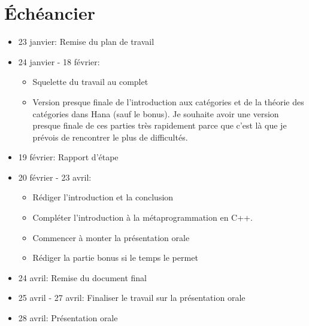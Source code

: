 \documentclass{article}
\begin{document}
\section{Échéancier}
\begin{itemize}
    \item 23 janvier: Remise du plan de travail
    \item 24 janvier - 18 février:
    \begin{itemize}
        \item Squelette du travail au complet
        \item Version presque finale de l'introduction aux catégories et de la
        théorie des catégories dans Hana (sauf le bonus). Je souhaite avoir
        une version presque finale de ces parties très rapidement parce que
        c'est là que je prévois de rencontrer le plus de difficultés.
    \end{itemize}
    \item 19 février: Rapport d'étape
    \item 20 février - 23 avril:
    \begin{itemize}
        \item Rédiger l'introduction et la conclusion
        \item Compléter l'introduction à la métaprogrammation en C++.
        \item Commencer à monter la présentation orale
        \item Rédiger la partie bonus si le temps le permet
    \end{itemize}
    \item 24 avril: Remise du document final
    \item 25 avril - 27 avril: Finaliser le travail sur la présentation orale
    \item 28 avril: Présentation orale
\end{itemize}
\end{document}
